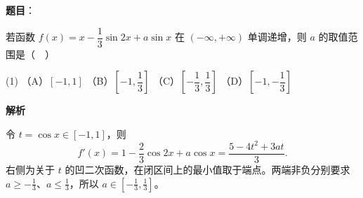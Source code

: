 \begin{answer}

\textbf{题目}：

若函数 \(f(x)=x-\dfrac{1}{3}\sin 2x+a\sin x\) 在 \(( -\infty,+\infty )\) 单调递增，则 \(a\) 的取值范围是（　）

\begin{gkopts}(1)
\task （A）\([-1,1]\)
\task （B）\([-1,\dfrac{1}{3}]\)
\task （C）\([-\dfrac{1}{3},\dfrac{1}{3}]\)
\task （D）\([-1,-\dfrac{1}{3}]\)
\end{gkopts}

\textbf{解析}

令 \(t=\cos x\in[-1,1]\)，则
\nopagebreak[4]
\[
f'(x)=1-\frac23\cos2x+a\cos x
=\frac{5-4t^2+3at}{3}.
\]
右侧为关于 \(t\) 的凹二次函数，在闭区间上的最小值取于端点。两端非负分别要求 \(a\ge-\frac13\)、\(a\le\frac13\)，所以 \(a\in[-\frac13,\frac13]\)。


\end{answer}

